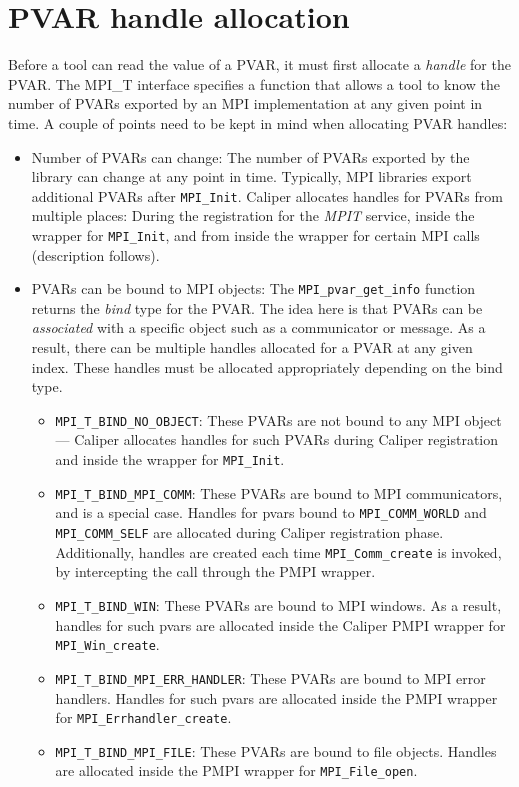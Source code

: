 \section{PVAR handle allocation}
Before a tool can read the value of a PVAR, it must first allocate a \emph{handle} for the PVAR. The MPI\_T interface specifies a function that allows a tool to know the number of PVARs exported by an MPI implementation at any given point in time. A couple of points need to be kept in mind when allocating PVAR handles:
\begin{itemize}
	\item Number of PVARs can change: The number of PVARs exported by the library can change at any point in time. Typically, MPI libraries export additional PVARs after \verb+MPI_Init+. Caliper allocates handles for PVARs from multiple places: During the registration for the \emph{MPIT} service, inside the wrapper for \verb+MPI_Init+, and from inside the wrapper for certain MPI calls (description follows).
	\item PVARs can be bound to MPI objects: The \verb+MPI_pvar_get_info+ function returns the \emph{bind} type for the PVAR. The idea here is that PVARs can be \emph{associated} with a specific object such as a communicator or message. As a result, there can be multiple handles allocated for a PVAR at any given index. These handles must be allocated appropriately depending on the bind type.
		\begin{itemize}
			\item \verb+MPI_T_BIND_NO_OBJECT+: These PVARs are not bound to any MPI object --- Caliper allocates handles for such PVARs during Caliper registration and inside the wrapper for \verb+MPI_Init+.
			\item \verb+MPI_T_BIND_MPI_COMM+: These PVARs are bound to MPI communicators, and is a special case. Handles for pvars bound to \verb+MPI_COMM_WORLD+ and \verb+MPI_COMM_SELF+ are allocated during Caliper registration phase. Additionally, handles are created each time \verb+MPI_Comm_create+ is invoked, by intercepting the call through the PMPI wrapper.
			\item \verb+MPI_T_BIND_WIN+: These PVARs are bound to MPI windows. As a result, handles for such pvars are allocated inside the Caliper PMPI wrapper for \verb+MPI_Win_create+.
			\item \verb+MPI_T_BIND_MPI_ERR_HANDLER+: These PVARs are bound to MPI error handlers. Handles for such pvars are allocated inside the PMPI wrapper for \verb+MPI_Errhandler_create+.
			\item \verb+MPI_T_BIND_MPI_FILE+: These PVARs are bound to file objects. Handles are allocated inside the PMPI wrapper for \verb+MPI_File_open+.

\end{itemize}
\end{itemize}
